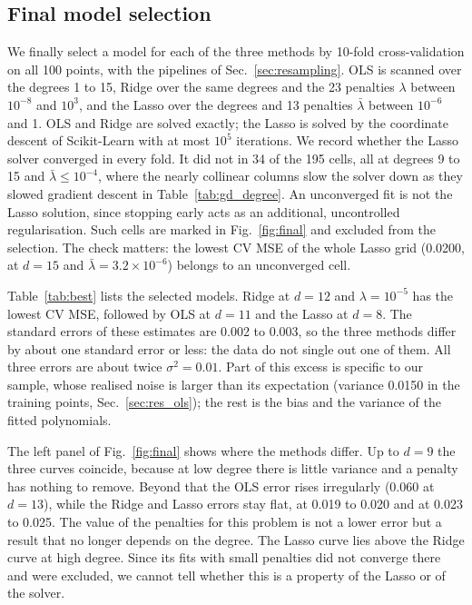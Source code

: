\documentclass[aps,reprint,amsmath,amssymb,nofootinbib,floatfix]{revtex4-2}
\newcommand{\lb}{\bar\lambda}
\begin{document}
\subsection{Final model selection}\label{sec:res_final}

We finally select a model for each of the three methods by 10-fold cross-validation on all 100
points, with the pipelines of Sec.~\ref{sec:resampling}. OLS is scanned over the degrees 1 to 15,
Ridge over the same degrees and the 23 penalties $\lambda$ between $10^{-8}$ and $10^{3}$, and
the Lasso over the degrees and 13 penalties $\lb$ between $10^{-6}$ and 1. OLS and Ridge are
solved exactly; the Lasso is solved by the coordinate descent of Scikit-Learn with at most
$10^{5}$ iterations. We record whether the Lasso solver converged in every fold. It did not in
34 of the 195 cells, all at degrees 9 to 15 and $\lb\le10^{-4}$, where the nearly collinear
columns slow the solver down as they slowed gradient descent in Table~\ref{tab:gd_degree}. An
unconverged fit is not the Lasso solution, since stopping early acts as an additional,
uncontrolled regularisation. Such cells are marked in Fig.~\ref{fig:final} and excluded from the
selection. The check matters: the lowest CV MSE of the whole Lasso grid (0.0200, at $d=15$ and
$\lb=3.2\times10^{-6}$) belongs to an unconverged cell.

Table~\ref{tab:best} lists the selected models. Ridge at $d=12$ and $\lambda=10^{-5}$ has the
lowest CV MSE, followed by OLS at $d=11$ and the Lasso at $d=8$. The standard errors of these
estimates are 0.002 to 0.003, so the three methods differ by about one standard error or less:
the data do not single out one of them. All three errors are about twice $\sigma^2=0.01$. Part of
this excess is specific to our sample, whose realised noise is larger than its expectation
(variance 0.0150 in the training points, Sec.~\ref{sec:res_ols}); the rest is the bias and the
variance of the fitted polynomials.

The left panel of Fig.~\ref{fig:final} shows where the methods differ. Up to $d=9$ the three
curves coincide, because at low degree there is little variance and a penalty has nothing to
remove. Beyond that the OLS error rises irregularly (0.060 at $d=13$), while the Ridge and Lasso
errors stay flat, at 0.019 to 0.020 and at 0.023 to 0.025. The value of the penalties for this
problem is not a lower error but a result that no longer depends on the degree. The Lasso curve
lies above the Ridge curve at high degree. Since its fits with small penalties did not converge
there and were excluded, we cannot tell whether this is a property of the Lasso or of the solver.
\end{document}
